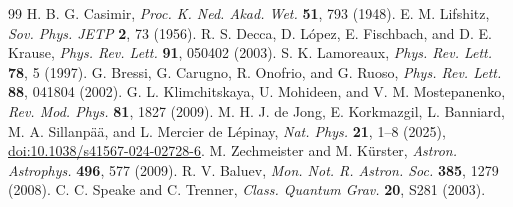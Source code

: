 \documentclass[10pt,twocolumn,a4paper]{article}
\begin{document}
\begin{thebibliography}{99}
 H. B. G. Casimir, \textit{Proc. K. Ned. Akad. Wet.} \textbf{51}, 793 (1948).
 E. M. Lifshitz, \textit{Sov. Phys. JETP} \textbf{2}, 73 (1956).
 R. S. Decca, D. L\'opez, E. Fischbach, and D. E. Krause, \textit{Phys. Rev. Lett.} \textbf{91}, 050402 (2003).
 S. K. Lamoreaux, \textit{Phys. Rev. Lett.} \textbf{78}, 5 (1997).
 G. Bressi, G. Carugno, R. Onofrio, and G. Ruoso, \textit{Phys. Rev. Lett.} \textbf{88}, 041804 (2002).
 G. L. Klimchitskaya, U. Mohideen, and V. M. Mostepanenko, \textit{Rev. Mod. Phys.} \textbf{81}, 1827 (2009).
 M. H. J. de Jong, E. Korkmazgil, L. Banniard, M. A. Sillanp\"a\"a, and L. Mercier de L\'epinay, \textit{Nat. Phys.} \textbf{21}, 1--8 (2025), \href{https://doi.org/10.1038/s41567-024-02728-6}{doi:10.1038/s41567-024-02728-6}.
 M. Zechmeister and M. K\"urster, \textit{Astron. Astrophys.} \textbf{496}, 577 (2009).
 R. V. Baluev, \textit{Mon. Not. R. Astron. Soc.} \textbf{385}, 1279 (2008).
 C. C. Speake and C. Trenner, \textit{Class. Quantum Grav.} \textbf{20}, S281 (2003).
\end{thebibliography}
\end{document}
